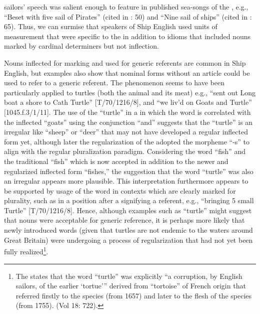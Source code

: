 sailors’ speech was salient enough to feature in published sea-songs of the , e.g., “Beset with five sail of Pirates” (cited in \citealt{Palmer1986}: 50) and “Nine sail of ships” (cited in \citealt{Palmer1986}: 65). Thus, we can surmise that speakers of Ship English used   units of measurement that were specific to the  in addition to idioms that included  nouns marked by cardinal determiners but not inflection. 

Nouns inflected for  marking and used for generic referents are common in Ship English, but examples also show that  nominal forms without an article could be used to refer to a generic referent. The phenomenon seems to have been particularly applied to turtles (both the animal and its meat) e.g., “sent out Long boat a shore to Cath Turtle” [T/70/1216/8], and “we liv’d on Goats and Turtle” [1045.f.3/1/11]. The use of the   “turtle” in a  in which the word is correlated with the inflected  “goats” using the conjunction “and” suggests that the  “turtle” is an irregular  like “sheep” or “deer” that may not have developed a regular inflected form yet, although later the regularization of the  adopted the morpheme “-s” to align with the regular pluralization paradigm. Considering the word “fish” and the traditional   “fish” which is now accepted in addition to the newer and regularized inflected form “fishes,” the suggestion that the word “turtle” was also an irregular  appears more plausible. This interpretation furthermore appears to be supported by usage of the word in contexts which are clearly marked for plurality, such as in a position after a  signifying a  referent, e.g., “bringing 5 small Turtle” [T/70/1216/8]. Hence, although examples such as “turtle” might suggest that  nouns were acceptable for generic reference, it is perhaps more likely that newly introduced words (given that turtles are not endemic to the waters around Great Britain) were undergoing a process of regularization that had not yet been fully realized\footnote{The \citet{oed1989} states that the word “turtle” was explicitly “a corruption, by English sailors, of the earlier ‘tortue’” derived from “tortoise” of French origin that referred firstly to the species (from 1657) and later to the flesh of the species (from 1755). (Vol 18: 722).}. 

